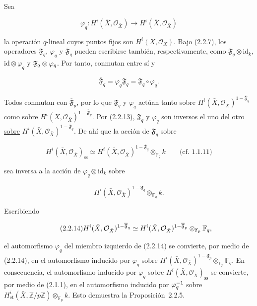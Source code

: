Sea

\pageoriginale

\begin{equation}\tag{2.2.12}
\varphi_q:H^i(\bar X,\mathcal O_{\bar X})
\longrightarrow H^i(\bar X,\mathcal O_{\bar X})
\end{equation}

la operación $q$-lineal cuyos puntos fijos son
$H^i(X,\mathcal O_X)$. Bajo (2.2.7), los operadores $\mathfrak F_q$,
$\varphi_q$ y $\overline{\mathfrak F}_q$ pueden escribirse también,
respectivamente, como $\mathfrak F_q\otimes\mathrm{id}_k$,
$\mathrm{id}\otimes\varphi_q$ y
$\sisi{\mathfrak F_k\otimes\varphi_k}{\mathfrak F_q\otimes\varphi_q}$. Por tanto, conmutan entre sí y

\begin{equation}\tag{2.2.13}
\overline{\mathfrak F}_q
=\varphi_q\mathfrak F_q
=\mathfrak F_q\circ\varphi_q.
\end{equation}

Todos conmutan con $\overline{\mathfrak F}_p$, por lo que $\mathfrak F_q$ y
$\varphi_q$ actúan tanto sobre
$H^i(\bar X,\mathcal O_{\bar X})^{1-\overline{\mathfrak F}_q}$ como sobre
$H^i(\bar X,\mathcal O_{\bar X})^{1-\overline{\mathfrak F}_p}$. Por (2.2.13),
$\mathfrak F_q$ y $\varphi_q$ son inversos el uno del otro \underline{sobre}
$H^i(\bar X,\mathcal O_{\bar X})^{1-\overline{\mathfrak F}_q}$. De ahí
que la acción de $\mathfrak F_q$ sobre

\[
H^i(\bar X,\mathcal O_{\bar X})_{\mathrm{ss}}
\simeq
H^i(\bar X,\mathcal O_{\bar X})^{1-\overline{\mathfrak F}_q}
\otimes_{\mathbb F_q}k
\qquad\text{(cf.~1.1.11)}
\]

sea inversa a la acción de $\varphi_q\otimes\mathrm{id}_k$ sobre

\[
H^i(\bar X,\mathcal O_{\bar X})^{1-\overline{\mathfrak F}_q}
\otimes_{\mathbb F_q}k.
\]

Escribiendo

\begin{equation}\tag{2.2.14}
H^i(\bar X,\mathcal O_{\bar X})^{1-\sisi{\mathfrak F_q}{\overline{\mathfrak F}_q}}
\simeq
H^i(\bar X,\mathcal O_{\bar X})^{1-\sisi{\mathfrak F_p}{\overline{\mathfrak F}_p}}
\otimes_{\mathbb F_p}\mathbb F_q,
\end{equation}

el automorfismo $\varphi_q$ del miembro izquierdo de (2.2.14) se
convierte, por medio de (2.2.14), en el automorfismo inducido por
$\varphi_q$ sobre
$H^i(\bar X,\mathcal O_{\bar X})^{1-\overline{\mathfrak F}_p}
\otimes_{\mathbb F_p}\mathbb F_q$. En consecuencia, el automorfismo
inducido por $\varphi_q$ sobre
$H^i(\bar X,\mathcal O_{\bar X})_{\mathrm{ss}}$ se convierte, por medio
de (2.1.1), en el automorfismo inducido por
$\sisi{\varphi_q}{\varphi_q^{-1}}$ sobre
$H^i_{\mathrm{et}}(\bar X,\mathbb Z/p\mathbb Z)
\otimes_{\mathbb F_p}k$. Esto demuestra la Proposición~2.2.5.

